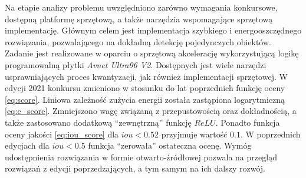 Na etapie analizy problemu uwzględniono zarówno wymagania konkursowe, dostępną platformę sprzętową, a także  narzędzia wspomagające sprzętową implementację.
Głównym celem jest implementacja szybkiego i energooszczędnego rozwiązania, pozwalającego na dokładną detekcję pojedynczych obiektów. 
Zadanie jest realizowane w oparciu o sprzętową akcelerację wykorzystującą logikę programowalną płytki \emph{Avnet Ultra96 V2}.
Dostępnych jest wiele narzędzi usprawniających proces kwantyzacji, jak również implementacji sprzętowej.
W edycji 2021 konkursu zmieniono w stosunku do lat poprzednich funkcję oceny \eqref{eq:score}. Liniowa zależność zużycia energii została zastąpiona logarytmiczną \eqref{eq:e_score}. 
Zmniejszono wagę związaną z przepustowością oraz dokładnością, a także zastosowano dodatkową ``zewnętrzną'' funkcję $ReLU$. 
Ponadto funkcja oceny jakości \eqref{eq:iou_score} dla $iou < 0.52$ przyjmuje wartość $0.1$. 
W poprzednich edycjach dla $iou < 0.5$ funkcja ``zerowała'' ostateczna ocenę.   
Wymóg udostępnienia rozwiązania w formie otwarto-źródłowej pozwala na przegląd rozwiązań z edycji poprzedzających, a tym samym na ich dalszy rozwój.






    

